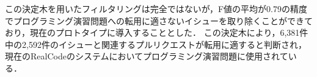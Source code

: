 この決定木を用いたフィルタリングは完全ではないが，F値の平均が0.79の精度でプログラミング演習問題への転用に適さないイシューを取り除くことができており，現在のプロトタイプに導入することとした．
この決定木により，6,381件中の2,592件のイシューと関連するプルリクエストが転用に適すると判断され，現在のRealCodeのシステムにおいてプログラミング演習問題に使用されている．









